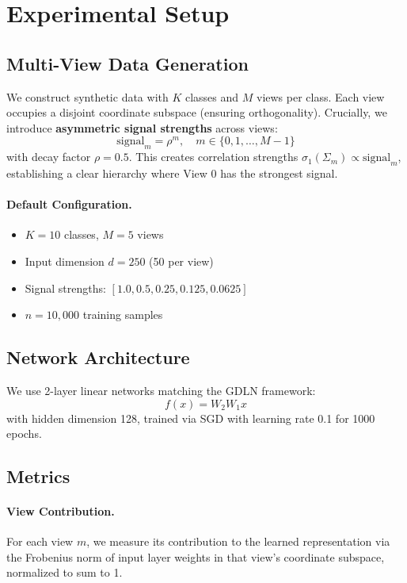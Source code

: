 \documentclass{article}
\begin{document}
\section{Experimental Setup}
\label{sec:setup}

\subsection{Multi-View Data Generation}

We construct synthetic data with $K$ classes and $M$ views per class. Each view occupies a disjoint coordinate subspace (ensuring orthogonality). Crucially, we introduce \textbf{asymmetric signal strengths} across views:
\begin{equation}
    \text{signal}_m = \rho^m, \quad m \in \{0, 1, \ldots, M-1\}
\end{equation}
with decay factor $\rho = 0.5$. This creates correlation strengths $\sigma_1(\Sigma_m) \propto \text{signal}_m$, establishing a clear hierarchy where View 0 has the strongest signal.

\paragraph{Default Configuration.}
\begin{itemize}
    \item $K = 10$ classes, $M = 5$ views
    \item Input dimension $d = 250$ (50 per view)
    \item Signal strengths: $[1.0, 0.5, 0.25, 0.125, 0.0625]$
    \item $n = 10{,}000$ training samples
\end{itemize}

\subsection{Network Architecture}

We use 2-layer linear networks matching the GDLN framework:
\begin{equation}
    f(x) = W_2 W_1 x
\end{equation}
with hidden dimension 128, trained via SGD with learning rate 0.1 for 1000 epochs.

\subsection{Metrics}

\paragraph{View Contribution.} For each view $m$, we measure its contribution to the learned representation via the Frobenius norm of input layer weights in that view's coordinate subspace, normalized to sum to 1.
\end{document}
